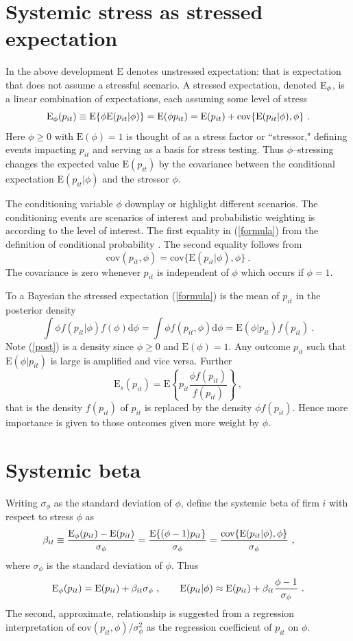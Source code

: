 \documentclass[authoryear]{elsarticle}
\newcommand{\E}{\mathrm{E}}
\newcommand{\cov}{\mathrm{cov}}
\newcommand{\de}{\mathrm{d}}
\newcommand{\eref}[1]{(\ref{#1})}
\newcommand{\cq}{\ , \qquad}
\newcommand{\be}[1]{\begin{equation}\label{#1}}
\newcommand{\ee}{\end{equation}}
\begin{document}
\section{Systemic stress as stressed expectation}

In the above development $\E$  denotes  unstressed expectation:  that is expectation that does not assume a stressful scenario.   A stressed expectation, denoted $\Es$, is a
linear combination of  expectations, each assuming some level of stress
\be{formula}
\Es(p_{it}) \equiv \E\{\phi\E(p_{it}|\phi)\} = \E(\phi p_{it}) = \E(p_{it}) + \cov\{\E(p_{it}|\phi),\phi\}\ .
\ee 
Here $\phi\ge 0$ with $\E(\phi)=1$ is thought of as a stress factor or ``stressor,"  defining events impacting $p_{it}$  and serving as a basis for stress testing.  Thus $\phi$--stressing  changes the expected value $\E(p_{it})$ by the covariance between the conditional expectation $\E(p_{it}|\phi)$  and the stressor $\phi$.

The conditioning variable $\phi$  downplay or highlight different scenarios.  The conditioning events are scenarios of interest and  probabilistic weighting is according to the level of interest.  The first equality in \eref{formula}  from the definition of conditional probability \citep{whittle2000probability}.  The second equality follows from
$$
\cov(p_{it},\phi)=\cov\{\E(p_{it}|\phi),\phi\}\ .
$$
The covariance is zero whenever  $p_{it}$ is independent of $\phi$ which occurs if $\phi=1$.

  To a Bayesian the stressed expectation \eref{formula}  is the mean of $p_{it}$  in  the posterior density
\be{post}
\int \phi f(p_{it}|\phi) f(\phi)\de \phi=\int \phi f(p_{it},\phi)\de \phi= \E(\phi|p_{it})f(p_{it})\ .
\ee
Note \eref{post} is a density since $\phi\ge 0$ and $\E(\phi)=1$.   Any outcome $p_{it}$ such that $\E(\phi|p_{it})$ is large  is amplified and vice versa.   Further
$$
\E_s(p_{it})  = \E\left\{p_{it} \frac{\phi f(p_{it})}{f(p_{it})}\right\}\ ,
$$
that is the density  $f(p_{it})$ of $p_{it}$  is replaced by  the density $\phi f(p_{it})$.  Hence more importance is given to those outcomes given more weight by $\phi$. 


\section{Systemic beta}
Writing  $\sigma_{\phi}$ as the standard deviation of $\phi$,  define the systemic beta of firm $i$ with respect to stress $\phi$ as
\be{zscore}
\beta_{it}\equiv \frac{\Es(p_{it})- \E(p_{it})}{\sigma_\phi}= \frac{\E\{(\phi-1)p_{it}\}}{\sigma_\phi}= \frac{ \cov\{\E(p_{it}|\phi),\phi\}}{\sigma_\phi} \cq
\ee
where  $\sigma_\phi$ is the standard deviation of $\phi$.  Thus
\be{zscore2}
\Es(p_{it}) = \E(p_{it}) + \beta_{it}\sigma_\phi\cq \E(p_{it}|\phi) \approx \E(p_{it}) + \beta_{it}\frac{\phi-1}{\sigma_\phi}\ .
\ee
The second, approximate, relationship is suggested from  a regression interpretation of $\cov(p_{it},\phi)/\sigma^2_\phi$ as the regression coefficient of $p_{it}$ on $\phi$.
\end{document}

